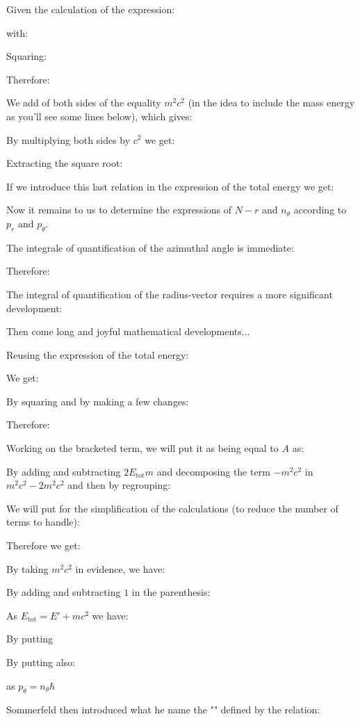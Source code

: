 	Given the calculation of the expression:
	
	with:
	
	Squaring:
	
	Therefore:
	
	We add of both sides of the equality $m^2c^2$ (in the idea to include the mass energy as you'll see some lines below), which gives:
	
	By multiplying both sides by $c^2$ we get:
	
	Extracting the square root:
	
	If we introduce this last relation in the expression of the total energy we get:
	
	Now it remains to us to determine the expressions of $N-r$ and $n_\theta$ according to $p_r$ and $p_\theta$.

	The integrale of quantification of the azimuthal angle is immediate:
	
	Therefore:
	
	The integral of quantification of the radius-vector requires a more significant development:
	
	Then come long and joyful mathematical developments...

	Reusing the expression of the total energy:
	
	We get:
	
	By squaring and by making a few changes:
	
	Therefore:
	
	Working on the bracketed term, we will put it as being equal to $A$ as:
	
	By adding and subtracting $2E_\text{tot}m$ and decomposing the term $-m^2c^2$ in $m^2c^2-2m^2c^2$ and then by regrouping:
	
	We will put for the simplification of the calculations (to reduce the number of terms to handle):
	
	Therefore we get:
	
	By taking $m^2c^2$ in evidence, we have:
	
	By adding and subtracting $1$ in the parenthesis:
	
	
	As $E_\text{tot}=E'+mc^2$ we have:
	
	By putting
	
	By putting also:
	
	as $p_\theta=n_\theta\hbar$

	Sommerfeld then introduced what he name the "" defined by the relation:
	

